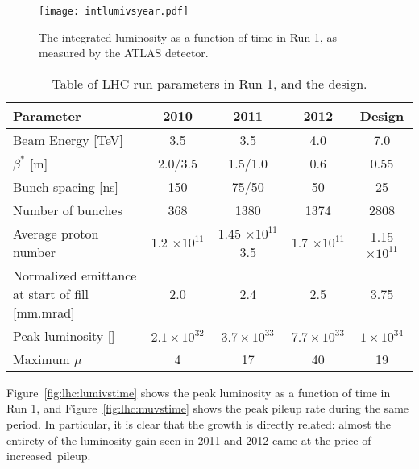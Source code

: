 \begin{figure}
\centering
\texttt{[image: intlumivsyear.pdf]}
\label{fig:lhc:lumivsyear}
\caption{The integrated luminosity as a function of time in Run 1, as measured by the ATLAS detector.}
\end{figure}


\begin{table}
	\caption{Table of LHC run parameters in Run 1, and the design.}
	\label{tab:lhc:parameters}
	\begin{center}
		\begin{tabular}{l|cccc}
		\hline

		\hline
		\textbf{Parameter} & \textbf{2010} & \textbf{2011} & \textbf{2012} & \textbf{Design} \\
		\hline
			 Beam Energy [TeV] & 3.5 &        3.5    &       4.0 &            7.0\\
			 $\beta^*$ [m]      & 2.0/3.5 &     1.5/1.0   &       0.6 &            0.55\\
			 Bunch spacing [ns] & 150 &         75/50   &       50 &             25\\
			 Number of bunches  & 368 &         1380    &       1374 &           2808\\
			 Average proton number  & 1.2 $\times 10^{11}$ &    1.45 $\times 10^{11}$     3.5    &   1.7 $\times 10^{11}$ &     1.15 $\times 10^{11}$\\
			 Normalized emittance at start of fill [mm.mrad]  & 2.0 &    2.4 &      2.5    &   3.75\\
			 Peak luminosity [\lumirate] & $2.1\times 10^{32}$   &  $3.7 \times 10^{33}$   & $7.7 \times 10^{33}$ & $1 \times 10^{34}$ \\
			 Maximum $\mu$ &  4  &  17   &  40 & 19 \\
		\hline

		\hline
		\end{tabular}
	\end{center}
\end{table}

Figure~\ref{fig:lhc:lumivstime} shows the peak luminosity as a function of time in Run 1, and Figure~\ref{fig:lhc:muvstime} shows the peak pileup rate during the same period. In particular, it is clear that the growth is directly related: almost the entirety of the luminosity gain seen in 2011 and 2012 came at the price of increased~pileup.


